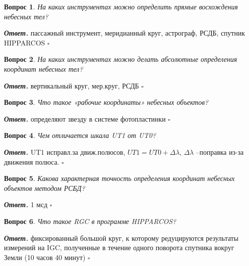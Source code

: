 \documentclass[12pt]{article}
\newtheorem{problem}{Вопрос}
\newenvironment{solution}[1][\it{Ответ}]{\textbf{#1. } }{$\square$}
\begin{document}
		\begin{problem}
			На каких инструментах можно
			определить прямые восхождения
			небесных тел? 
		\end{problem}
		
		\begin{solution}
			пассажный инструмент, меридианный
			круг, астрограф, РСДБ, спутник
			HIPPARCOS		
		\end{solution}
		
		\begin{problem}
			На каких инструментах можно
			делать абсолютные определения
			координат небесных тел? 
		\end{problem}
		
		\begin{solution}
			вертикальный круг,
			мер.круг, РСДБ		
		\end{solution}
		
		\begin{problem}
			Что такое «рабочие координаты»
			небесных объектов?
		\end{problem}
		
		\begin{solution}
			определяют
			звезду в системе фотопластинки		
		\end{solution}
		
		\begin{problem}
			Чем отличается шкала UT1 от
			UT0?
		\end{problem}
		
		\begin{solution}
			UT1 исправл.за движ.полюсов,
			$UT1=UT0+\Delta\lambda$, $\Delta\lambda$ --поправка из-за движения полюса.
		\end{solution}
		
		\begin{problem}
			Какова характерная точность
			определения координат небесных
			объектов методом РСБД?
		\end{problem}
		
		\begin{solution}
			1 мсд	
		\end{solution}
		
		\begin{problem}
			Что такое RGC в программе
			HIPPARCOS?
		\end{problem}
		
		\begin{solution}
			фиксированный
			большой круг, к которому
			редуцируются результаты измерений
			на IGC, полученные в течение одного поворота
			спутника вокруг Земли (10 часов 40 минут)
		\end{solution}
		
\end{document}
